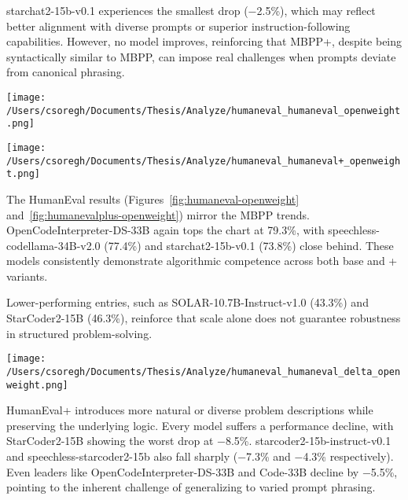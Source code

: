 starchat2-15b-v0.1 experiences the smallest drop (−2.5\%), which may reflect better alignment with diverse prompts or superior instruction-following capabilities. However, no model improves, reinforcing that MBPP+, despite being syntactically similar to MBPP, can impose real challenges when prompts deviate from canonical phrasing.

\begin{center}
	\texttt{[image: /Users/csoregh/Documents/Thesis/Analyze/humaneval\_humaneval\_openweight.png]}
	\label{fig:humaneval-openweight}
\end{center}

\begin{center}
	\texttt{[image: /Users/csoregh/Documents/Thesis/Analyze/humaneval\_humaneval+\_openweight.png]}
	\label{fig:humanevalplus-openweight}
\end{center}

The HumanEval results (Figures~\ref{fig:humaneval-openweight} and~\ref{fig:humanevalplus-openweight}) mirror the \gls{MBPP} trends. OpenCodeInterpreter-DS-33B again tops the chart at 79.3\%, with speechless-codellama-34B-v2.0 (77.4\%) and starchat2-15b-v0.1 (73.8\%) close behind. These models consistently demonstrate algorithmic competence across both base and + variants.

Lower-performing entries, such as SOLAR-10.7B-Instruct-v1.0 (43.3\%) and StarCoder2-15B (46.3\%), reinforce that scale alone does not guarantee robustness in structured problem-solving.

\begin{center}
	\texttt{[image: /Users/csoregh/Documents/Thesis/Analyze/humaneval\_humaneval\_delta\_openweight.png]}
	\label{fig:humaneval-delta-openweight}
\end{center}

HumanEval+ introduces more natural or diverse problem descriptions while preserving the underlying logic. Every model suffers a performance decline, with StarCoder2-15B showing the worst drop at −8.5\%. starcoder2-15b-instruct-v0.1 and speechless-starcoder2-15b also fall sharply (−7.3\% and −4.3\% respectively). Even leaders like OpenCodeInterpreter-DS-33B and Code-33B decline by −5.5\%, pointing to the inherent challenge of generalizing to varied prompt phrasing.

